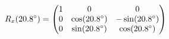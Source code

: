 \documentclass[preview]{standalone}
\begin{document}
\begin{align*}
\special{dvisvgm:raw <g id='unique000'>}R_x(20.8^\circ) = \begin{pmatrix} 1 & 0 & 0 \\ 0 & \cos(20.8^\circ) & -\sin(20.8^\circ) \\ 0 & \sin(20.8^\circ) & \cos(20.8^\circ) \end{pmatrix}\special{dvisvgm:raw </g>}
\end{align*}
\end{document}
